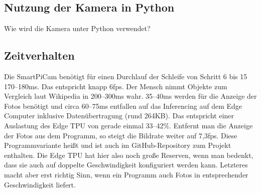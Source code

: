 %
%
%




\subsection{Nutzung der Kamera in Python}

Wie wird die Kamera unter Python verwendet?



\subsection{Zeitverhalten}

Die SmartPiCam benötigt für einen Durchlauf der Schleife von Schritt 6 bis 15 170–180ms. Das entspricht knapp 6\ac{fps}. Der Mensch nimmt Objekte zum Vergleich laut Wikipedia in 200–300ms wahr. 35–40ms werden für die Anzeige der Fotos benötigt und circa 60–75ms entfallen auf das Inferencing auf dem Edge Computer inklusive Datenübertragung (rund 264KB). Das entspricht einer Auslastung des Edge TPU  von gerade einmal 33–42\%. Entfernt man die Anzeige der Fotos aus dem Programm, so steigt die Bildrate weiter auf 7,3fps. Diese Programmvariante 
heißt  und ist auch im 
GitHub-Repository zum Projekt enthalten. Die Edge TPU 
hat hier also noch große Reserven, wenn man bedenkt, 
dass sie auch auf doppelte Geschwindigkeit konfiguriert 
werden kann. Letzteres macht aber erst richtig Sinn, wenn 
ein Programm auch Fotos in entsprechender Geschwindigkeit liefert.
